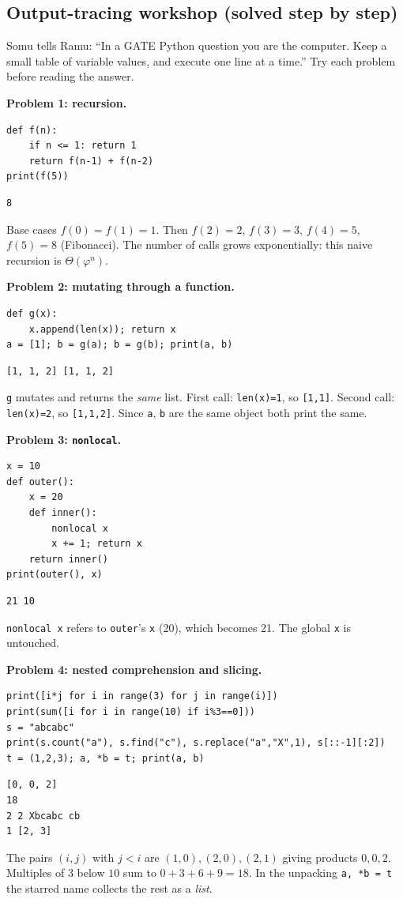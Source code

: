 \documentclass[11pt,a4paper]{article}
\newcommand{\py}[1]{\texttt{#1}}
\begin{document}
\subsection{Output-tracing workshop (solved step by step)}
\begin{story}
Somu tells Ramu: ``In a GATE Python question you are the computer. Keep a small table of variable values, and execute one line at a time.'' Try each problem before reading the answer.
\end{story}
\textbf{Problem 1: recursion.}
\begin{lstlisting}
def f(n):
    if n <= 1: return 1
    return f(n-1) + f(n-2)
print(f(5))
\end{lstlisting}
\begin{lstlisting}[style=out]
8
\end{lstlisting}
Base cases $f(0)=f(1)=1$. Then $f(2)=2$, $f(3)=3$, $f(4)=5$, $f(5)=8$ (Fibonacci). The number of calls grows exponentially: this naive recursion is $\Theta(\varphi^n)$.

\textbf{Problem 2: mutating through a function.}
\begin{lstlisting}
def g(x):
    x.append(len(x)); return x
a = [1]; b = g(a); b = g(b); print(a, b)
\end{lstlisting}
\begin{lstlisting}[style=out]
[1, 1, 2] [1, 1, 2]
\end{lstlisting}
\py{g} mutates and returns the \emph{same} list. First call: \py{len(x)=1}, so \py{[1,1]}. Second call: \py{len(x)=2}, so \py{[1,1,2]}. Since \py{a}, \py{b} are the same object both print the same.

\textbf{Problem 3: \py{nonlocal}.}
\begin{lstlisting}
x = 10
def outer():
    x = 20
    def inner():
        nonlocal x
        x += 1; return x
    return inner()
print(outer(), x)
\end{lstlisting}
\begin{lstlisting}[style=out]
21 10
\end{lstlisting}
\py{nonlocal x} refers to \py{outer}'s \py{x} (20), which becomes 21. The global \py{x} is untouched.

\textbf{Problem 4: nested comprehension and slicing.}
\begin{lstlisting}
print([i*j for i in range(3) for j in range(i)])
print(sum([i for i in range(10) if i%3==0]))
s = "abcabc"
print(s.count("a"), s.find("c"), s.replace("a","X",1), s[::-1][:2])
t = (1,2,3); a, *b = t; print(a, b)
\end{lstlisting}
\begin{lstlisting}[style=out]
[0, 0, 2]
18
2 2 Xbcabc cb
1 [2, 3]
\end{lstlisting}
The pairs $(i,j)$ with $j<i$ are $(1,0),(2,0),(2,1)$ giving products $0,0,2$. Multiples of $3$ below $10$ sum to $0+3+6+9=18$. In the unpacking \py{a, *b = t} the starred name collects the rest as a \emph{list}.
\end{document}
